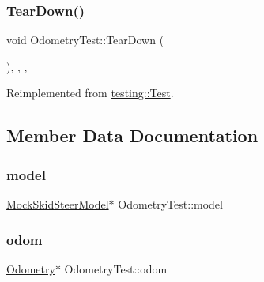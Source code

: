 \subsubsection{\texorpdfstring{TearDown()}{TearDown()}}
{\footnotesize\ttfamily void Odometry\+Test\+::\+Tear\+Down (\begin{DoxyParamCaption}{ }\end{DoxyParamCaption})\hspace{0.3cm}{\ttfamily [inline]}, {\ttfamily [override]}, {\ttfamily [protected]}, {\ttfamily [virtual]}}



Reimplemented from \mbox{\hyperlink{classtesting_1_1Test_a5f0ab439802cbe0ef7552f1a9f791923}{testing\+::\+Test}}.



\subsection{Member Data Documentation}
\mbox{\label{classOdometryTest_a4cdbfcbfdf2a70f6bbb39c652596250b}} 
\subsubsection{\texorpdfstring{model}{model}}
{\footnotesize\ttfamily \mbox{\hyperlink{classokapi_1_1MockSkidSteerModel}{Mock\+Skid\+Steer\+Model}}$\ast$ Odometry\+Test\+::model\hspace{0.3cm}{\ttfamily [protected]}}

\mbox{\label{classOdometryTest_ab00eb120bd549552ab5eb2d211142980}} 
\subsubsection{\texorpdfstring{odom}{odom}}
{\footnotesize\ttfamily \mbox{\hyperlink{classokapi_1_1Odometry}{Odometry}}$\ast$ Odometry\+Test\+::odom\hspace{0.3cm}{\ttfamily [protected]}}

\mbox{\label{classOdometryTest_a46d630ba4303e69822aee734c92b587a}} 
